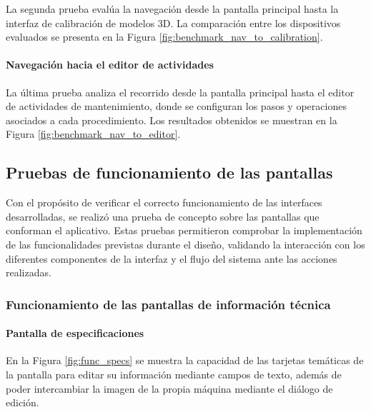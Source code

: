                 La segunda prueba evalúa la navegación desde la pantalla principal hasta la interfaz de calibración de modelos 3D. La comparación entre los dispositivos evaluados se presenta en la Figura \ref{fig:benchmark_nav_to_calibration}.

                

            \paragraph{Navegación hacia el editor de actividades}

                La última prueba analiza el recorrido desde la pantalla principal hasta el editor de actividades de mantenimiento, donde se configuran los pasos y operaciones asociados a cada procedimiento. Los resultados obtenidos se muestran en la Figura \ref{fig:benchmark_nav_to_editor}.

                

    \subsection{Pruebas de funcionamiento de las pantallas}

        Con el propósito de verificar el correcto funcionamiento de las interfaces desarrolladas, se realizó una prueba de concepto sobre las pantallas que conforman el aplicativo. Estas pruebas permitieron comprobar la implementación de las funcionalidades previstas durante el diseño, validando la interacción con los diferentes componentes de la interfaz y el flujo del sistema ante las acciones realizadas.

        \subsubsection{Funcionamiento de las pantallas de información técnica}

            \paragraph{Pantalla de especificaciones}

                En la Figura \ref{fig:func_specs} se muestra la capacidad de las tarjetas temáticas de la pantalla para editar su información mediante campos de texto, además de poder intercambiar la imagen de la propia máquina mediante el diálogo de edición.

